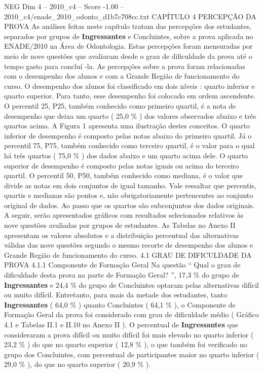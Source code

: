 \begin{textsample}{NEG Dim 4 – 2010\_c4 – Score -1.00 – 2010\_c4/enade\_2010\_odonto\_d1b7c708cc.txt}  \label{ex:f4_neg_063}
CAPÍTULO 4 PERCEPÇÃO DA PROVA As análises feitas neste capítulo tratam das percepções dos estudantes, separados por grupos de \textbf{Ingressantes} e Concluintes, sobre a prova aplicada no ENADE/2010 na Área de Odontologia.
Estas percepções foram mensuradas por meio de nove questões que avaliaram desde o grau de dificuldade da prova até o tempo gasto para concluí -la.
As percepções sobre a prova foram relacionadas com o desempenho dos alunos e com a Grande Região de funcionamento do curso.
O desempenho dos alunos foi classificado em dois níveis : quarto inferior e quarto superior.
Para tanto, esse desempenho foi colocado em ordem ascendente.
O percentil 25, P25, também conhecido como primeiro quartil, é a nota de desempenho que deixa um quarto ( 25,0 \% ) dos valores observados abaixo e três quartos acima.
A Figura 1 apresenta uma ilustração destes conceitos.
O quarto inferior de desempenho é composto pelas notas abaixo do primeiro quartil.
Já o percentil 75, P75, também conhecido como terceiro quartil, é o valor para o qual há três quartos ( 75,0 \% ) dos dados abaixo e um quarto acima dele.
O quarto superior de desempenho é composto pelas notas iguais ou acima do terceiro quartil.
O percentil 50, P50, também conhecido como mediana, é o valor que divide as notas em dois conjuntos de igual tamanho.
Vale ressaltar que percentis, quartis e medianas são pontos e, não obrigatoriamente pertencentes ao conjunto original de dados.
Ao passo que os quartos são subconjuntos dos dados originais.
A seguir, serão apresentados gráficos com resultados selecionados relativos às nove questões avaliadas por grupos de estudantes.
As Tabelas no Anexo II apresentam os valores absolutos e a distribuição percentual das alternativas válidas das nove questões segundo o mesmo recorte de desempenho dos alunos e Grande Região de funcionamento do curso. 4.1 GRAU DE DIFICULDADE DA PROVA 4.1.1 Componente de Formação Geral Na questão “ Qual o grau de dificuldade desta prova na parte de Formação Geral? ”, 17,3 \% do grupo de \textbf{Ingressantes} e 24,4 \% do grupo de Concluintes optaram pelas alternativas difícil ou muito difícil.
Entretanto, para mais da metade dos estudantes, tanto \textbf{Ingressantes} ( 64,0 \% ) quanto Concluintes ( 64,1 \% ), o Componente de Formação Geral da prova foi considerado com grau de dificuldade médio ( Gráfico 4.1 e Tabelas II.1 e II.10 no Anexo II ).
O percentual de \textbf{Ingressantes} que consideraram a prova difícil ou muito difícil foi mais elevado no quarto inferior ( 23,2 \% ) do que no quarto superior ( 12,8 \% ), o que também foi verificado no grupo dos Concluintes, com percentual de participantes maior no quarto inferior ( 29,0 \% ), do que no quarto superior ( 20,9 \% ).

\end{textsample}
